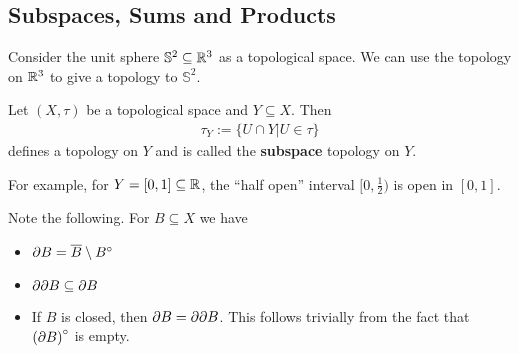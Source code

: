 \subsection{Subspaces, Sums and Products}
Consider the unit sphere $\mathbb{S}^{2} \subseteq \mathbb{R}^3$ as a topological space. 
We can use the topology on $\mathbb{R}^3$ to give a topology to $\mathbb{S}^2$.

\begin{dfn}[]
  Let $(X,\tau)$ be a topological space and $Y \subseteq X$. Then
  \begin{align*}
    \tau_Y := \{U \cap Y \big\vert U \in  \tau\}
  \end{align*}
  defines a topology on $Y$ and is called the \textbf{subspace} topology on $Y$.
\end{dfn}
For example, for $Y = [0,1] \subseteq \mathbb{R}$, the ``half open'' interval $[0, \frac{1}{2})$ is open in $[0,1]$.

Note the following. For $B \subseteq X$ we have
\begin{itemize}
  \item $\partial B = \overline{B} \setminus B^{\circ}$
  \item $\partial \partial B \subseteq \partial B$
  \item If $B$ is closed, then $\partial B = \partial \partial B$. This follows trivially from the fact that $\left(\partial B\right)^{\circ}$ is empty.
\end{itemize}

